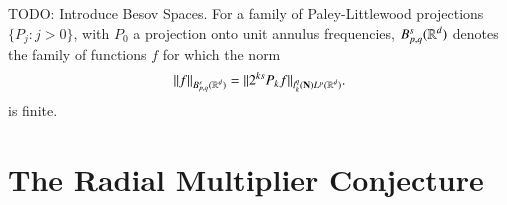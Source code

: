 %
%
%
%
%
%
%
%

TODO: Introduce Besov Spaces. For a family of Paley-Littlewood projections $\{ P_j : j > 0 \}$, with $P_0$ a projection onto unit annulus frequencies, $B^s_{p,q}(\operatorname{\mathbb{R}}^d)$ denotes the family of functions $f$ for which the norm
%
\[ \| f \|_{B^s_{p,q}(\operatorname{\mathbb{R}}^d)} = \| 2^{ks} P_k f \|_{l^q_k(\mathbf{N}) L^p(\operatorname{\mathbb{R}}^d)}. \]
%
is finite. 

\section{The Radial Multiplier Conjecture}


